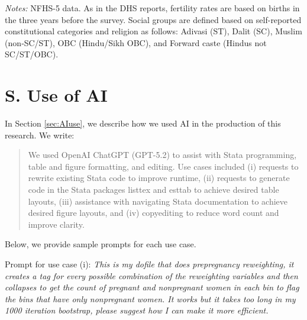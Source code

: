 \documentclass[12pt]{article}
\begin{document}
\newpage
\begin{table}[H]
    \centering

    \begin{threeparttable}
            
    \caption{: Fertility rates by social group}
    \label{tab:tfr}
    \renewcommand{\arraystretch}{1.5}
    \scriptsize
    \setlength{\tabcolsep}{5pt}
    \resizebox{\textwidth}{!}{%
        
    }
    
    \small
    \begin{tablenotes}
        \item  \textit{Notes:} NFHS-5 data. As in the DHS reports, fertility rates are based on births in the three years before the survey. Social groups are defined based on self-reported constitutional categories and religion as follows: Adivasi (ST), Dalit (SC), Muslim (non‐SC/ST), OBC (Hindu/Sikh OBC), and Forward caste (Hindus not SC/ST/OBC).
    \end{tablenotes}

    \end{threeparttable}
\end{table}

\newpage




\section{S. Use of AI} \label{sec:aiprompts}
In Section \ref{sec:AIuse}, we describe how we used AI in the production of this research.  We write:

\begin{quote}
We used OpenAI ChatGPT (GPT-5.2) to assist with Stata programming, table and figure formatting, and editing. Use cases included (i) requests to rewrite existing Stata code to improve runtime, (ii) requests to generate code in the Stata packages listtex and esttab to achieve desired table layouts, (iii) assistance with navigating Stata documentation to achieve desired figure layouts, and (iv) copyediting to reduce word count and improve clarity.
\end{quote}

Below, we provide sample prompts for each use case.

Prompt for use case (i):
\emph{This is my dofile that does prepregnancy reweighting, it creates a tag for every possible combination of the reweighting variables and then collapses to get the count of pregnant and nonpregnant women in each bin to flag the bins that have only nonpregnant women. It works but it takes too long in my 1000 iteration bootstrap, please suggest how I can make it more efficient.} 
\end{document}
